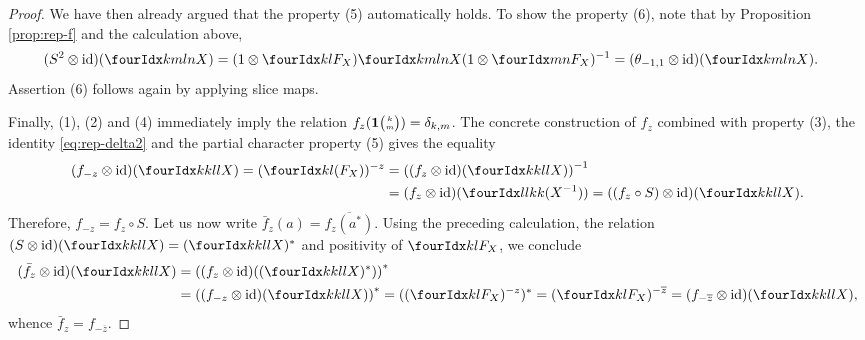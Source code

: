 \begin{proof}
We have then already argued that the property (5) automatically holds. To show the property (6), note that by Proposition \ref{prop:rep-f} and the calculation above,
    \begin{align*}
      (S^{2} \otimes \id)(\Gr{X}{k}{l}{m}{n}) &= (1
      \otimes\Gru{F_{X}}{k}{l})
      \Gr{X}{k}{l}{m}{n}(1 \otimes \Gru{F_{X}}{m}{n})^{-1} 
      =(\theta_{-1,1}  \otimes \id)(\Gr{X}{k}{l}{m}{n}).
    \end{align*}
     Assertion (6) follows again by applying slice maps.
    
     Finally, (1), (2) and (4)
     immediately imply the relation
     $f_{z}(\mathbf{1}{\tiny {\begin{pmatrix} k\\m\end{pmatrix}}})=\delta_{k,m}$. The concrete construction of $f_z$ combined with property (3), the identity \eqref{eq:rep-delta2} and the partial character property (5) gives the equality
     \begin{align*}
       (f_{-z} \otimes \id) (\Gr{X}{k}{l}{k}{l})=
       (\Gru{(F_{X})}{k}{l})^{-z} &=\left( (f_{z} \otimes
       \id)(\Gr{X}{k}{l}{k}{l})\right)^{-1} \\ &= (f_{z} \otimes
       \id)(\Gr{(X^{-1})}{l}{k}{l}{k}) = ((f_{z} \circ S) \otimes
       \id)(\Gr{X}{k}{l}{k}{l}).
     \end{align*}
Therefore, $f_{-z} = f_{z} \circ S$. Let us now write $\bar{f}_z(a) = \overline{f_z(a^*)}$. Using the preceding calculation,
     the relation $(S \otimes \id)(\Gr{X}{k}{l}{k}{l}) =
     (\Gr{X}{k}{l}{k}{l})^{*}$ and positivity of $\Gru{F_{X}}{k}{l}$,
     we conclude
     \begin{align*}
       (\bar{f}_z \otimes
       \id)(\Gr{X}{k}{l}{k}{l})
&=       \left((f_{z} \otimes
       \id)((\Gr{X}{k}{l}{k}{l})^{*})\right)^{*} \\
& = \left((f_{-z} \otimes \id)(\Gr{X}{k}{l}{k}{l})\right)^{*} 
 =
((\Gru{F_{X}}{k}{l})^{-z})^{*} 
=       (\Gru{F_{X}}{k}{l})^{-\overline{z}} = (f_{-\overline{z}}
\otimes \id)(\Gr{X}{k}{l}{k}{l}),
     \end{align*}
whence $\bar{f}_z = f_{-\overline{z}}$.
\end{proof}
